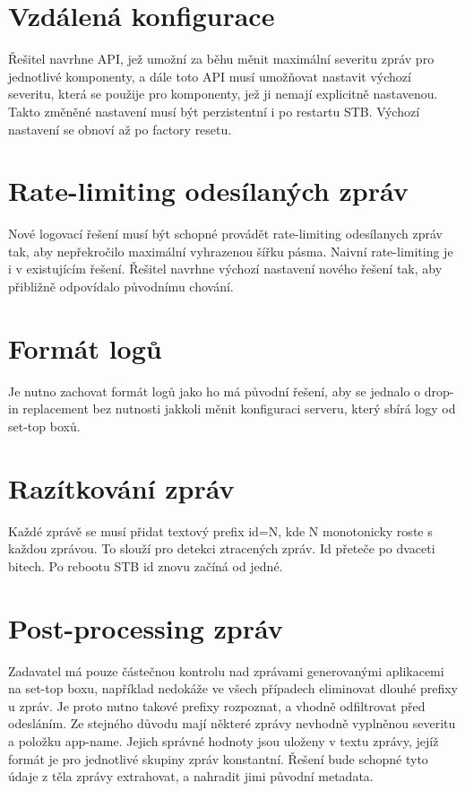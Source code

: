 \documentclass[thesis=B,czech]{FITthesis}[2012/06/26]
\begin{document}
\section*{Vzdálená konfigurace}
Řešitel navrhne API, jež umožní za běhu měnit maximální severitu zpráv pro jednotlivé komponenty, a dále toto API musí umožňovat nastavit výchozí severitu, která se použije pro komponenty, jež ji nemají explicitně nastavenou. Takto změněné nastavení musí být perzistentní i po restartu STB. Výchozí nastavení se obnoví až po factory resetu.

\section*{Rate-limiting odesílaných zpráv}
Nové logovací řešení musí být schopné provádět rate-limiting odesílanych zpráv tak, aby nepřekročilo maximální vyhrazenou šířku pásma. Naivní rate-limiting je i v existujícím řešení. Řešitel navrhne výchozí nastavení nového řešení tak, aby přibližně odpovídalo původnímu chování. 

\section*{Formát logů}
Je nutno zachovat formát logů jako ho má původní řešení, aby se jednalo o drop-in replacement bez nutnosti jakkoli měnit konfiguraci serveru, který sbírá logy od set-top boxů.

\section*{Razítkování zpráv}
Každé zprávě se musí přidat textový prefix id=N, kde N monotonicky roste s každou zprávou.  To slouží pro detekci ztracených zpráv. Id přeteče po dvaceti bitech. Po rebootu STB id znovu začíná od jedné.

\section*{Post-processing zpráv}
Zadavatel má pouze částečnou kontrolu nad zprávami generovanými aplikacemi na set-top boxu, například nedokáže ve všech případech eliminovat dlouhé prefixy u zpráv. Je proto nutno takové prefixy rozpoznat, a vhodně odfiltrovat před odesláním. Ze stejného důvodu mají některé zprávy nevhodně vyplněnou severitu a položku app-name. Jejich správné hodnoty jsou uloženy v textu zprávy, jejíž formát je pro jednotlivé skupiny zpráv konstantní. Řešení bude schopné tyto údaje z těla zprávy extrahovat, a nahradit jimi původní metadata.
 
\end{document}

